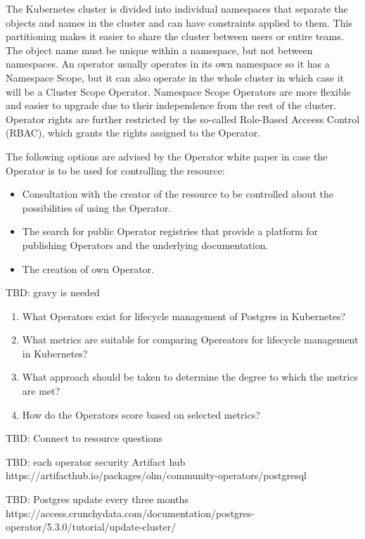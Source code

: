 The Kubernetes cluster is divided into individual namespaces that separate the objects and names in the cluster and can have constraints applied to them. This partitioning makes it easier to share the cluster between users or entire teams. The object name must be unique within a namespace, but not between namespaces.  An operator usually operates in its own namespace so it has a Namespace Scope, but it can also operate in the whole cluster in which case it will be a Cluster Scope Operator. Namespace Scope Operators are more flexible and easier to upgrade due to their independence from the rest of the cluster. Operator rights are further restricted by the so-called Role-Based Acceess Control (RBAC), which grants the rights assigned to the Operator. \cite{ OperatorsAtK8sIface}

The following options are advised by the Operator white paper \cite{OperatorWhitepaper} in case the Operator is to be used for controlling the resource:
\begin{itemize}
  \item	Consultation with the creator of the resource to be controlled about the possibilities of using the Operator.
  \item	The search for public Operator registries that provide a platform for publishing Operators and the underlying documentation.
  \item	The creation of own Operator.
\end{itemize}

TBD: gravy is needed

\begin{enumerate}
  \item What Operators exist for lifecycle management of Postgres in Kubernetes?
  \item What metrics are suitable for comparing Opereators for lifecycle management in Kubernetes?
  \item What approach should be taken to determine the degree to which the metrics are met?
  \item How do the Operators score based on selected metrics?
\end{enumerate}

TBD: Connect to resource questions


TBD: each operator security Artifact hub https://artifacthub.io/packages/olm/community-operators/postgresql

TBD: Postgres update every three months https://access.crunchydata.com/documentation/postgres-operator/5.3.0/tutorial/update-cluster/

